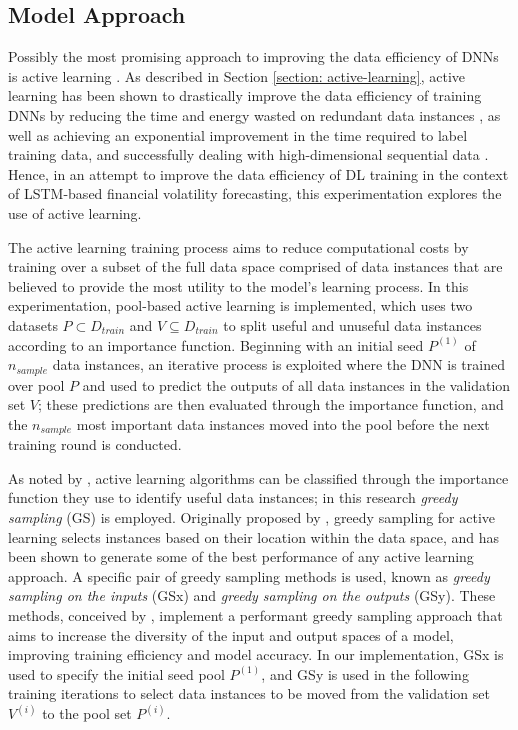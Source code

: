 \documentclass[a4paper, 11pt]{report}
\begin{document}
    \subsection{Model Approach}

    Possibly the most promising approach to improving the data efficiency of DNNs is active learning \citep{ren-2021}. As described in Section \ref{section: active-learning}, active learning has been shown to drastically improve the data efficiency of training DNNs by reducing the time and energy wasted on redundant data instances \citep{xu-2021}, as well as achieving an exponential improvement in the time required to label training data, and successfully dealing with high-dimensional sequential data \citep{ren-2021}. Hence, in an attempt to improve the data efficiency of DL training in the context of LSTM-based financial volatility forecasting, this experimentation explores the use of active learning.

    The active learning training process aims to reduce computational costs by training over a subset of the full data space comprised of data instances that are believed to provide the most utility to the model's learning process. In this experimentation, pool-based active learning is implemented, which uses two datasets $P \subset D_{train}$ and $V \subseteq D_{train}$ to split useful and unuseful data instances according to an importance function. Beginning with an initial seed $P^{(1)}$ of $n_{sample}$ data instances, an iterative process is exploited where the DNN is trained over pool $P$ and used to predict the outputs of all data instances in the validation set $V$; these predictions are then evaluated through the importance function, and the $n_{sample}$ most important data instances moved into the pool before the next training round is conducted.

    As noted by \citet{xu-2021}, active learning algorithms can be classified through the importance function they use to identify useful data instances; in this research \emph{greedy sampling} (GS) is employed. Originally proposed by \citet{yu-2010}, greedy sampling for active learning selects instances based on their location within the data space, and has been shown to generate some of the best performance of any active learning approach. A specific pair of greedy sampling methods is used, known as \emph{greedy sampling on the inputs} (GSx) and \emph{greedy sampling on the outputs} (GSy). These methods, conceived by \citet{wu-2019}, implement a performant greedy sampling approach that aims to increase the diversity of the input and output spaces of a model, improving training efficiency and model accuracy. In our implementation, GSx is used to specify the initial seed pool $P^{(1)}$, and GSy is used in the following training iterations to select data instances to be moved from the validation set $V^{(i)}$ to the pool set $P^{(i)}$. 
\end{document}
